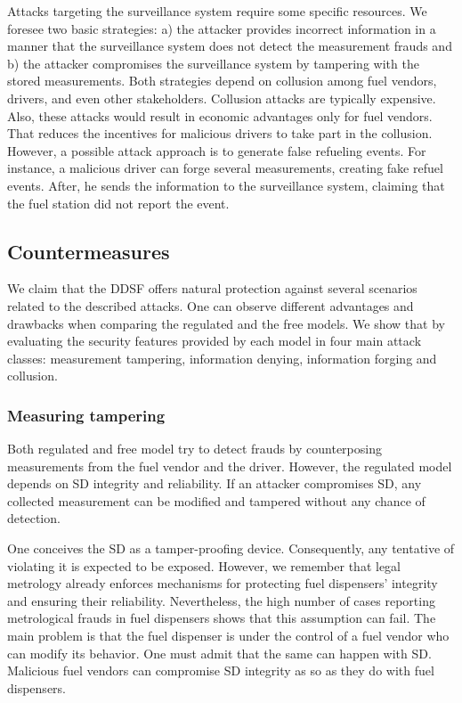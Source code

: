 \documentclass[sigplan]{acmart}
\begin{document}
Attacks targeting the surveillance system require some specific resources.
We foresee two basic strategies: a) the attacker provides incorrect information in a manner that the surveillance system does not detect the measurement frauds and b) the attacker compromises the surveillance system by tampering with the stored measurements.
Both strategies depend on collusion among fuel vendors, drivers, and even other stakeholders.
Collusion attacks are typically expensive.
Also, these attacks would result in economic advantages only for fuel vendors.
That reduces the incentives for malicious drivers to take part in the collusion.
However, a possible attack approach is to generate false refueling events.
For instance, a malicious driver can forge several measurements, creating fake refuel events.
After, he sends the information to the surveillance system, claiming that the fuel station did not report the event.

\subsection{Countermeasures}
We claim that the DDSF offers natural protection against several scenarios related to the described attacks.
One can observe different advantages and drawbacks when comparing the regulated and the free models.
We show that by evaluating the security features provided by each model in four main attack classes: measurement tampering, information denying, information forging and collusion.

\subsubsection{Measuring tampering}
Both regulated and free model try to detect frauds by counterposing measurements from the fuel vendor and the driver.
However, the regulated model depends on SD integrity and reliability.
If an attacker compromises SD, any collected measurement can be modified and tampered without any chance of detection.

One conceives the SD as a tamper-proofing device.
Consequently, any tentative of violating it is expected to be exposed.
However, we remember that legal metrology already enforces mechanisms for protecting fuel dispensers' integrity and ensuring their reliability.
Nevertheless, the high number of cases reporting metrological frauds in fuel dispensers shows that this assumption can fail.
The main problem is that the fuel dispenser is under the control of a fuel vendor who can modify its behavior.
One must admit that the same can happen with SD.
Malicious fuel vendors can compromise SD integrity as so as they do with fuel dispensers.
\end{document}
